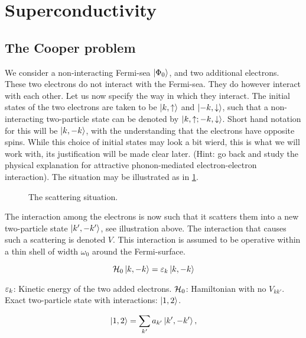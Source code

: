 \section{Superconductivity}
\subsection{The Cooper problem}

We consider a non-interacting Fermi-sea $\ket{\Phi_0}$, and two additional electrons. These two electrons do not interact with the Fermi-sea. They do however interact with each other. Let us now specify the way in which they interact. The initial states of the two electrons are taken to be $\ket{k,\uparrow}$ and $\ket{-k, \downarrow}$, such that a non-interacting two-particle state can be denoted by $\ket{k, \uparrow; -k, \downarrow}$. Short hand notation for this will be $\ket{k, -k}$, with the understanding that the electrons have opposite spins. While this choice of initial states may look a bit wierd, this is what we will work with, its justification will be made clear later. (Hint: go back and study the physical explanation for attractive phonon-mediated electron-electron interaction). The situation may be illustrated as in \cref{fig:cooper_situation}.

\begin{figure}
	\centering
	
	\caption{The scattering situation. }
	\label{fig:cooper_situation}
\end{figure}

The interaction among the electrons is now such that it scatters them into a new two-particle state $\ket{k', -k'}$, see illustration above. The interaction that causes such a scattering is denoted $V$. This interaction is assumed to be operative within a thin shell of width $\omega_0$ around the Fermi-surface. 

\begin{equation}
\mathcal{H}_0 \ket{k,-k} = \varepsilon_k \ket{k,-k}
\end{equation}

$\varepsilon_k$: Kinetic energy of the two added electrons. $\mathcal{H}_0$: Hamiltonian with no $V_{kk'}$. \\

Exact two-particle state with interactions: $\ket{1,2}$. 

\begin{equation}
\ket{1,2} = \sum_{k'} a_{k'}\ket{k', -k'},
\end{equation}

